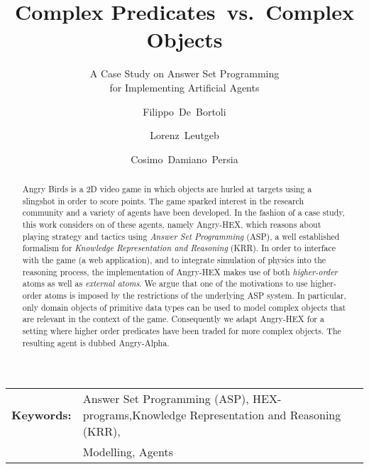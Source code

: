 \documentclass[orivec]{llncs}
\title{Complex Predicates~vs.~Complex Objects}
\subtitle{A Case Study on Answer Set Programming\\ for Implementing Artificial Agents}
\author{Filippo~De~Bortoli \and Lorenz~Leutgeb \and Cosimo~Damiano~Persia}
\institute{International Center for Computational Logic\\TU Dresden\\[2mm] \texttt{\{\href{mailto:filippo.de\_bortoli@mailbox.tu-dresden.de}{filippo.de\_bortoli},\href{mailto:lorenz.leutgeb@mailbox.tu-dresden.de}{lorenz.leutgeb},\href{mailto:cosimo\_damiano.persia@mailbox.tu-dresden.de}{cosimo\_damiano.persia}\}\newline @mailbox.tu-dresden.de}}
\newcommand{\ah}{Angry-HEX\xspace}
\newcommand{\ab}{Angry Birds\xspace}
\begin{document}
\maketitle

\begin{abstract}
\ab is a 2D video game in which objects are hurled at targets using a slingshot in order to score points. The game sparked interest in the research community and a variety of agents have been developed.
In the fashion of a case study, this work considers on of these agents, namely \ah, which reasons about playing strategy and tactics using \emph{Answer Set Programming} (ASP), a well established formalism for \emph{Knowledge Representation and Reasoning} (KRR).
In order to interface with the game (a web application), and to integrate simulation of physics into the reasoning process, the implementation of \ah makes use of both \emph{higher-order} atoms as well as \emph{external atoms}.
We argue that one of the motivations to use higher-order atoms is imposed by the restrictions of the underlying ASP system. In particular, only domain objects of primitive data types can be used to model complex objects that are relevant in the context of the game.
Consequently we adapt \ah for a setting where higher order predicates have been traded for more complex objects. The resulting agent is dubbed Angry-Alpha.
\end{abstract}

\begin{center}
\begin{tabular}{p{}p{}}
\bfseries{Keywords:} & Answer Set Programming (ASP), HEX-programs,\newline Knowledge Representation and Reasoning (KRR),\\ & Modelling, Agents\\
\end{tabular}
\end{center}








\end{document}
